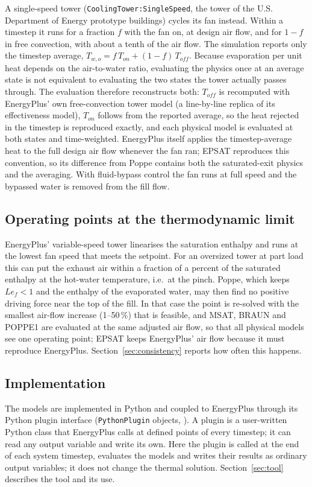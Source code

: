 \documentclass[preprint,12pt]{elsarticle}
\begin{document}
A single-speed tower (\texttt{CoolingTower:SingleSpeed}, the tower of the U.S. Department of Energy prototype
buildings) cycles its fan instead. Within a timestep it runs for a fraction $f$ with the fan on, at design air flow, and
for $1-f$ in free convection, with about a tenth of the air flow. The simulation reports only the timestep average,
$T_{w,o}=f\,T_{on}+(1-f)\,T_{off}$. Because evaporation per unit heat depends on the air-to-water ratio, evaluating the
physics once at an average state is not equivalent to evaluating the two states the tower actually passes through. The
evaluation therefore reconstructs both: $T_{off}$ is recomputed with EnergyPlus' own free-convection tower model (a
line-by-line replica of its effectiveness model), $T_{on}$ follows from the reported average, so the heat rejected in
the timestep is reproduced exactly, and each physical model is evaluated at both states and time-weighted. EnergyPlus
itself applies the timestep-average heat to the full design air flow whenever the fan ran; EPSAT reproduces this
convention, so its difference from Poppe contains both the saturated-exit physics and the averaging. With fluid-bypass
control the fan runs at full speed and the bypassed water is removed from the fill flow.

\subsection{Operating points at the thermodynamic limit}\label{sec:airflow}
EnergyPlus' variable-speed tower linearises the saturation enthalpy and runs at the lowest fan speed that meets the
setpoint. For an oversized tower at part load this can put the exhaust air within a fraction of a percent of the
saturated enthalpy at the hot-water temperature, i.e.\ at the pinch. Poppe, which keeps $Le_f<1$ and the enthalpy of the
evaporated water, may then find no positive driving force near the top of the fill. In that case the point is re-solved
with the smallest air-flow increase (1--50\,\%) that is feasible, and MSAT, BRAUN and POPPE1 are evaluated at the same
adjusted air flow, so that all physical models see one operating point; EPSAT keeps EnergyPlus' air flow because it must
reproduce EnergyPlus. Section~\ref{sec:consistency} reports how often this happens.

\subsection{Implementation}
The models are implemented in Python and coupled to EnergyPlus through its Python plugin interface
(\texttt{PythonPlugin} objects, \citep{doe2022ioref}). A plugin is a user-written Python class that EnergyPlus calls at
defined points of every timestep; it can read any output variable and write its own. Here the plugin is called at the
end of each system timestep, evaluates the models and writes their results as ordinary output variables; it does not
change the thermal solution. Section~\ref{sec:tool} describes the tool and its use.
\end{document}
